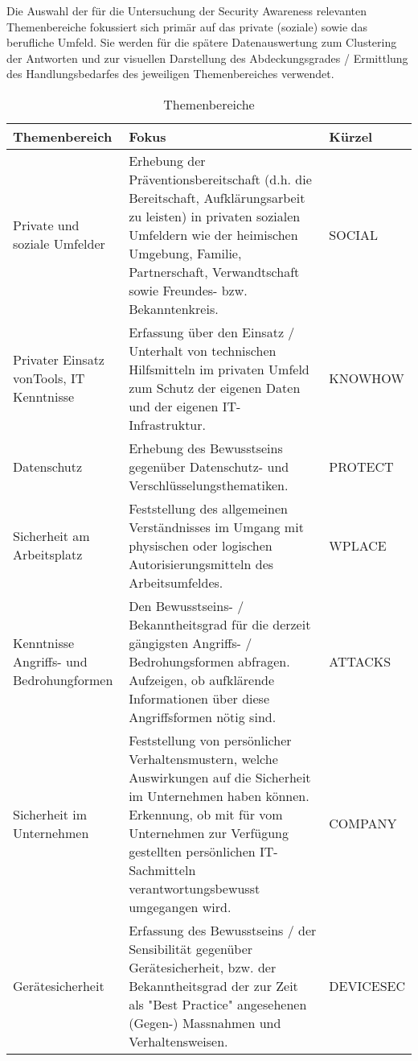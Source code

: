 \documentclass[../../main.tex]{subfiles}
\begin{document}
\begin{sloppypar}
Die Auswahl der für die Untersuchung der Security Awareness relevanten Themenbereiche fokussiert sich primär auf das private (soziale) sowie das berufliche Umfeld. Sie werden für die spätere Datenauswertung zum Clustering der Antworten und zur visuellen Darstellung des Abdeckungsgrades / Ermittlung des Handlungsbedarfes des jeweiligen Themenbereiches verwendet.
\end{sloppypar}



\sloppy 

\begin{table}[H]
\tablefontsize	
\centering
\caption{Themenbereiche}
\label{themenbereiche}

\begin{tabular}{ |p{4cm}|p{9.5cm}|p{2.5cm}|}

\hline
\tableheaderbgcolor
\textbf{Themenbereich} & \textbf{Fokus} & \textbf{Kürzel}\\ 
\hline
Private und \newline soziale Umfelder & Erhebung der Präventionsbereitschaft (d.h. die Bereitschaft, Aufklärungsarbeit zu leisten) in privaten sozialen Umfeldern wie der heimischen Umgebung, Familie, Partnerschaft, Verwandtschaft sowie Freundes- bzw. Bekanntenkreis. & SOCIAL\\
\hline
Privater Einsatz von\newline Tools, IT Kenntnisse & Erfassung über den Einsatz / Unterhalt von technischen Hilfsmitteln im privaten Umfeld zum Schutz der eigenen Daten und der eigenen IT-Infrastruktur. & KNOWHOW\\
\hline
Datenschutz & Erhebung des Bewusstseins gegenüber Datenschutz- und Verschlüsselungsthematiken. & PROTECT\\
\hline
Sicherheit am \newline Arbeitsplatz & Feststellung des allgemeinen Verständnisses im Umgang mit physischen oder logischen Autorisierungsmitteln des Arbeitsumfeldes. & WPLACE\\
\hline
Kenntnisse Angriffs- \newline und Bedrohungformen & Den Bewusstseins- / Bekanntheitsgrad für die derzeit gängigsten Angriffs- / Bedrohungsformen abfragen. Aufzeigen, ob aufklärende Informationen über diese Angriffsformen nötig sind. & ATTACKS\\
\hline
Sicherheit im \newline Unternehmen & Feststellung von persönlicher Verhaltensmustern, welche Auswirkungen auf die Sicherheit im Unternehmen haben können. Erkennung, ob mit für vom Unternehmen zur Verfügung gestellten persönlichen IT-Sachmitteln verantwortungsbewusst umgegangen wird. & COMPANY\\
\hline
Gerätesicherheit & Erfassung des Bewusstseins / der Sensibilität gegenüber Gerätesicherheit, bzw. der Bekanntheitsgrad der zur Zeit als "Best Practice" angesehenen (Gegen-) Massnahmen und Verhaltensweisen. & DEVICESEC\\
\hline

\end{tabular}
\end{table}
\end{document}
